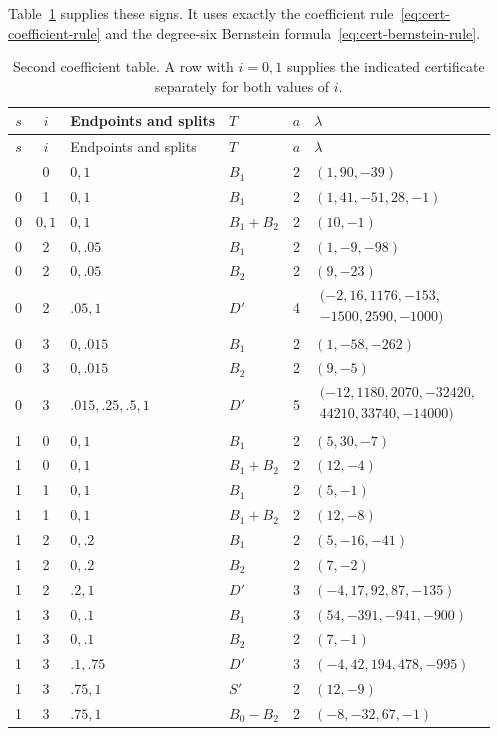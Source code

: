 Table~\ref{tab:cert-third} supplies these signs.  It uses exactly
the coefficient rule~\eqref{eq:cert-coefficient-rule} and the
degree-six Bernstein formula~\eqref{eq:cert-bernstein-rule}.

\begingroup
\small
\setlength{\tabcolsep}{3pt}
\renewcommand{\arraystretch}{1.18}
\begin{longtable}{@{}ccllc>{\raggedright\arraybackslash}p{}@{}}
\caption{Second coefficient table.  A row with $i=0,1$ supplies
 the indicated certificate separately for both values of $i$.}
\label{tab:cert-third}\\
\toprule
 $s$&$i$&Endpoints and splits&$T$&$a$&$\lambda$\\
\midrule
\endfirsthead
\toprule
 $s$&$i$&Endpoints and splits&$T$&$a$&$\lambda$\\
\midrule
\endhead
\bottomrule
\endfoot
 0&0&$0,1$&$B_1$&2&$(1,90,-39)$\\
 0&1&$0,1$&$B_1$&2&$(1,41,-51,28,-1)$\\
 0&$0,1$&$0,1$&$B_1+B_2$&2&$(10,-1)$\\
 0&2&$0,.05$&$B_1$&2&$(1,-9,-98)$\\
 0&2&$0,.05$&$B_2$&2&$(9,-23)$\\
 0&2&$.05,1$&$D'$&4&$\begin{gathered}(-2,16,1176,-153,\\-1500,2590,-1000)\end{gathered}$\\
 0&3&$0,.015$&$B_1$&2&$(1,-58,-262)$\\
 0&3&$0,.015$&$B_2$&2&$(9,-5)$\\
 0&3&$.015,.25,.5,1$&$D'$&5&$\begin{gathered}(-12,1180,2070,-32420,\\44210,33740,-14000)\end{gathered}$\\
 1&0&$0,1$&$B_1$&2&$(5,30,-7)$\\
 1&0&$0,1$&$B_1+B_2$&2&$(12,-4)$\\
 1&1&$0,1$&$B_1$&2&$(5,-1)$\\
 1&1&$0,1$&$B_1+B_2$&2&$(12,-8)$\\
 1&2&$0,.2$&$B_1$&2&$(5,-16,-41)$\\
 1&2&$0,.2$&$B_2$&2&$(7,-2)$\\
 1&2&$.2,1$&$D'$&3&$(-4,17,92,87,-135)$\\
 1&3&$0,.1$&$B_1$&3&$(54,-391,-941,-900)$\\
 1&3&$0,.1$&$B_2$&2&$(7,-1)$\\
 1&3&$.1,.75$&$D'$&3&$(-4,42,194,478,-995)$\\
 1&3&$.75,1$&$S'$&2&$(12,-9)$\\
 1&3&$.75,1$&$B_0-B_2$&2&$(-8,-32,67,-1)$\\
\end{longtable}
\endgroup

